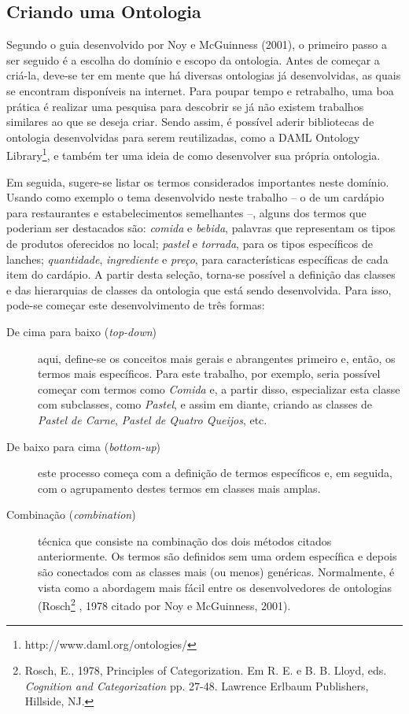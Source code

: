 \subsection{Criando uma Ontologia}
Segundo o guia desenvolvido por Noy e McGuinness (2001)\nocite{NOY2001}, o primeiro passo a ser seguido é a escolha do domínio e escopo da ontologia. Antes de começar a criá-la, deve-se ter em mente que há diversas ontologias já desenvolvidas, as quais se encontram disponíveis na internet. Para poupar tempo e retrabalho, uma boa prática é realizar uma pesquisa para descobrir se já não existem trabalhos similares ao que se deseja criar. Sendo assim, é possível aderir bibliotecas de ontologia desenvolvidas para serem reutilizadas, como a DAML Ontology Library\footnote{http://www.daml.org/ontologies/}, e também ter uma ideia de como desenvolver sua própria ontologia.

Em seguida, sugere-se listar os termos considerados importantes neste domínio. Usando como exemplo o tema desenvolvido neste trabalho -- o de um cardápio para restaurantes e estabelecimentos semelhantes --, alguns dos termos que poderiam ser destacados são: \emph{comida} e \emph{bebida}, palavras que representam os tipos de produtos oferecidos no local; \emph{pastel} e \emph{torrada}, para os tipos específicos de lanches; \emph{quantidade}, \emph{ingrediente} e \emph{preço}, para características específicas de cada item do cardápio. A partir desta seleção, torna-se possível a definição das classes e das hierarquias de classes da ontologia que está sendo desenvolvida. Para isso, pode-se começar este desenvolvimento de três formas:
\begin{description}
    \item [De cima para baixo (\emph{top-down})] aqui, define-se os conceitos mais gerais e abrangentes primeiro e, então, os termos mais específicos. Para este trabalho, por exemplo, seria possível começar com termos como \emph{Comida} e, a partir disso, especializar esta classe com subclasses, como \emph{Pastel}, e assim em diante, criando as classes de \emph{Pastel de Carne}, \emph{Pastel de Quatro Queijos}, etc.
    \item [De baixo para cima (\emph{bottom-up})] este processo começa com a definição de termos específicos e, em seguida, com o agrupamento destes termos em classes mais amplas.
    \item [Combinação (\emph{combination})] técnica que consiste na combinação dos dois métodos citados anteriormente. Os termos são definidos sem uma ordem específica e depois são conectados com as classes mais (ou menos) genéricas. Normalmente, é vista como a abordagem mais fácil entre os desenvolvedores de ontologias (Rosch\footnote{Rosch, E., 1978, Principles of Categorization. Em R. E. e B. B. Lloyd, eds. \emph{Cognition and Categorization} pp. 27-48. Lawrence Erlbaum Publishers, Hillside, NJ.} , 1978 citado por Noy e McGuinness, 2001).
\end{description}

